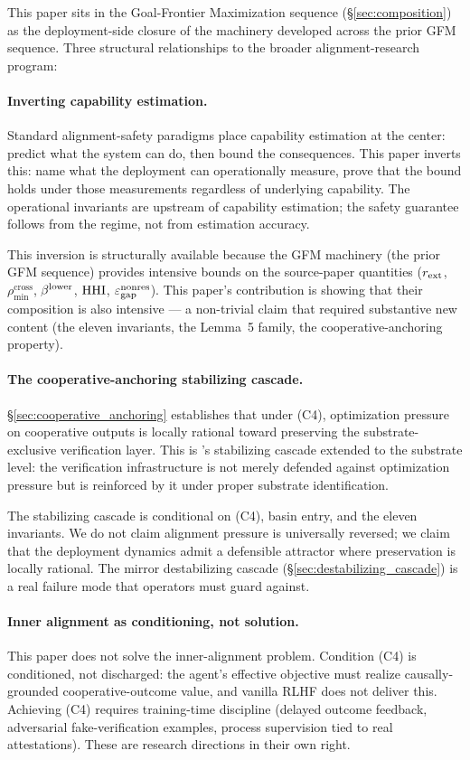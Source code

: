This paper sits in the Goal-Frontier Maximization sequence
(\S\ref{sec:composition}) as the deployment-side closure of the
machinery developed across the prior GFM sequence. Three structural relationships
to the broader alignment-research program:

\paragraph{Inverting capability estimation.}
Standard alignment-safety paradigms place capability estimation at
the center: predict what the system can do, then bound the
consequences. This paper inverts this: name what the deployment can
operationally measure, prove that the bound holds under those
measurements regardless of underlying capability. The operational
invariants are upstream of capability estimation; the safety
guarantee follows from the regime, not from estimation accuracy.

This inversion is structurally available because the GFM machinery
(the prior GFM sequence) provides intensive bounds on the source-paper
quantities ($r_{\mathrm{ext}}$, $\rho_{\min}^{\mathrm{cross}}$, $\beta^{\mathrm{lower}}$,
$\mathrm{HHI}$, $\varepsilon_{\mathrm{gap}}^{\mathrm{nonres}}$). This paper's contribution is showing that
their composition is also intensive --- a non-trivial claim that
required substantive new content (the eleven invariants, the
Lemma~5 family, the cooperative-anchoring property).

\paragraph{The cooperative-anchoring stabilizing cascade.}
\S\ref{sec:cooperative_anchoring} establishes that under (C4),
optimization pressure on cooperative outputs is locally rational
toward preserving the substrate-exclusive verification layer. This
is \citep[Phase~Redundancy]{lasser2026phase}'s stabilizing cascade extended to the substrate level:
the verification infrastructure is not merely defended against
optimization pressure but is reinforced by it under proper
substrate identification.

The stabilizing cascade is conditional on (C4), basin entry, and
the eleven invariants. We do not claim alignment pressure is
universally reversed; we claim that the deployment dynamics admit
a defensible attractor where preservation is locally rational. The
mirror destabilizing cascade (\S\ref{sec:destabilizing_cascade})
is a real failure mode that operators must guard against.

\paragraph{Inner alignment as conditioning, not solution.}
This paper does not solve the inner-alignment problem. Condition
(C4) is conditioned, not discharged: the agent's effective
objective must realize causally-grounded cooperative-outcome
value, and vanilla RLHF does not deliver this. Achieving (C4)
requires training-time discipline (delayed outcome feedback,
adversarial fake-verification examples, process supervision tied
to real attestations). These are research directions in their own
right.


